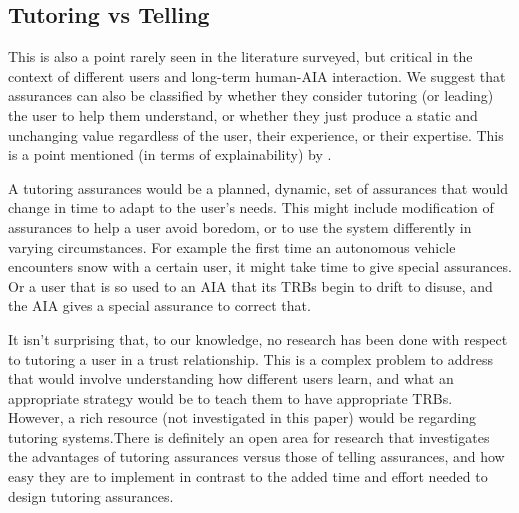\subsection{Tutoring vs Telling} \label{sec:teach_tell}
    This is also a point rarely seen in the literature surveyed, but critical in the context of different users and long-term human-AIA interaction. We suggest that assurances can also be classified by whether they consider tutoring (or leading) the user to help them understand, or whether they just produce a static and unchanging value regardless of the user, their experience, or their expertise. This is a point mentioned (in terms of explainability) by \citet{Lacave2002-cu}.

    A tutoring assurances would be a planned, dynamic, set of assurances that would change in time to adapt to the user's needs. This might include modification of assurances to help a user avoid boredom, or to use the system differently in varying circumstances. For example the first time an autonomous vehicle encounters snow with a certain user, it might take time to give special assurances. Or a user that is so used to an AIA that its TRBs begin to drift to disuse, and the AIA gives a special assurance to correct that.

    It isn't surprising that, to our knowledge, no research has been done with respect to tutoring a user in a trust relationship. This is a complex problem to address that would involve understanding how different users learn, and what an appropriate strategy would be to teach them to have appropriate TRBs. However, a rich resource (not investigated in this paper) would be regarding tutoring systems.There is definitely an open area for research that investigates the advantages of tutoring assurances versus those of telling assurances, and how easy they are to implement in contrast to the added time and effort needed to design tutoring assurances.
